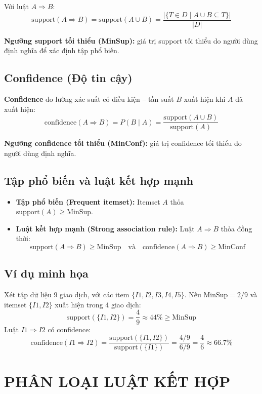 \documentclass[10pt]{article}
\begin{document}
Với luật $A \Rightarrow B$:
\[
\text{support}(A \Rightarrow B) = \text{support}(A \cup B) = \frac{|\{T \in D \mid A \cup B \subseteq T\}|}{|D|}
\]

\textbf{Ngưỡng support tối thiểu (MinSup):} giá trị support tối thiểu do người dùng định nghĩa để xác định tập phổ biến.

\subsection{Confidence (Độ tin cậy)}

\textbf{Confidence} đo lường xác suất có điều kiện -- tần suất $B$ xuất hiện khi $A$ đã xuất hiện:
\[
\text{confidence}(A \Rightarrow B) = P(B \mid A) = \frac{\text{support}(A \cup B)}{\text{support}(A)}
\]

\textbf{Ngưỡng confidence tối thiểu (MinConf):} giá trị confidence tối thiểu do người dùng định nghĩa.

\subsection{Tập phổ biến và luật kết hợp mạnh}

\begin{itemize}
    \item \textbf{Tập phổ biến (Frequent itemset):} Itemset $A$ thỏa $\text{support}(A) \geq \text{MinSup}$.
    \item \textbf{Luật kết hợp mạnh (Strong association rule):} Luật $A \Rightarrow B$ thỏa đồng thời:
    \[
    \text{support}(A \Rightarrow B) \geq \text{MinSup} \quad \text{và} \quad \text{confidence}(A \Rightarrow B) \geq \text{MinConf}
    \]
\end{itemize}

\subsection{Ví dụ minh họa}

Xét tập dữ liệu 9 giao dịch, với các item $\{I1, I2, I3, I4, I5\}$. Nếu $\text{MinSup} = 2/9$ và itemset $\{I1, I2\}$ xuất hiện trong 4 giao dịch:
\[
\text{support}(\{I1,I2\}) = \frac{4}{9} \approx 44\% \geq \text{MinSup}
\]
Luật $I1 \Rightarrow I2$ có confidence:
\[
\text{confidence}(I1 \Rightarrow I2) = \frac{\text{support}(\{I1,I2\})}{\text{support}(\{I1\})} = \frac{4/9}{6/9} = \frac{4}{6} \approx 66.7\%
\]

\section{PHÂN LOẠI LUẬT KẾT HỢP}
\end{document}
